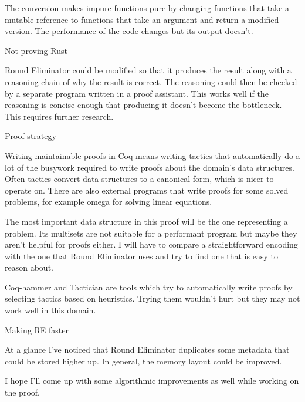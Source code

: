\documentclass{article}
\begin{document}
The conversion makes impure functions pure by changing functions that take a mutable reference to functions that take an argument and return a modified version. The performance of the code changes but its output doesn't.

Not proving Rust

Round Eliminator could be modified so that it produces the result along with a reasoning chain of why the result is correct. The reasoning could then be checked by a separate program written in a proof assistant. This works well if the reasoning is concise enough that producing it doesn't become the bottleneck. This requires further research.

Proof strategy

Writing maintainable proofs in Coq means writing tactics that automatically do a lot of the busywork required to write proofs about the domain's data structures. Often tactics convert data structures to a canonical form, which is nicer to operate on. There are also external programs that write proofs for some solved problems, for example omega for solving linear equations.

The most important data structure in this proof will be the one representing a problem. Its multisets are not suitable for a performant program but maybe they aren't helpful for proofs either. I will have to compare a straightforward encoding with the one that Round Eliminator uses and try to find one that is easy to reason about.

Coq-hammer and Tactician are tools which try to automatically write proofs by selecting tactics based on heuristics. Trying them wouldn't hurt but they may not work well in this domain.

Making RE faster

At a glance I've noticed that Round Eliminator duplicates some metadata that could be stored higher up. In general, the memory layout could be improved.

I hope I'll come up with some algorithmic improvements as well while working on the proof.



\end{document}
